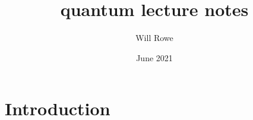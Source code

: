 \documentclass{article}
\title{quantum lecture notes}
\author{Will Rowe}
\date{June 2021}
\begin{document}
\maketitle

\section{Introduction}
\end{document}
